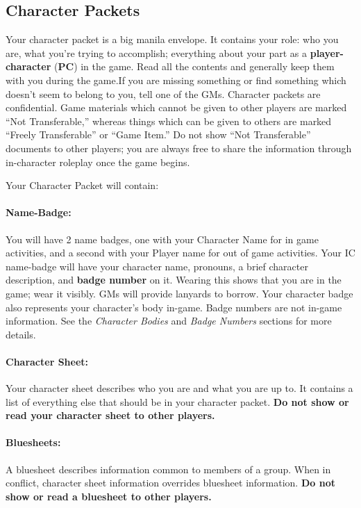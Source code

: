 \documentclass[sheet]{GL2020}
\begin{document}
\subsection{Character Packets}

Your character packet is a big manila envelope. It contains your role: who you are, what you're trying to accomplish; everything about your part as a {\bf player-character} ({\bf PC}) in the game. Read all the contents and generally keep them with you during the game.If you are missing something or find something which doesn't seem to belong to you, tell one of the GMs. Character packets are confidential. Game materials which cannot be given to other players are marked ``Not Transferable,'' whereas things which can be given to others are marked ``Freely Transferable'' or ``Game Item.'' Do not show ``Not Transferable'' documents to other players; you are always free to share the information through in-character roleplay once the game begins.

Your Character Packet will contain:
\paragraph{Name-Badge:} You will have 2 name badges, one with your Character Name for in game activities, and a second with your Player name for out of game activities. Your IC name-badge will have your character name, pronouns, a brief character description, and {\bf badge number} on it. Wearing this shows that you are in the game; wear it visibly. GMs will provide lanyards to borrow. Your character badge also represents your character's body in-game. Badge numbers are not in-game information. See the \emph{Character Bodies} and \emph{Badge Numbers} sections for more details.

\paragraph{Character Sheet:} Your character sheet describes who you are and what you are up to. It contains a list of everything else that should be in your character packet. \textbf{Do not show or read your character sheet to other players.}

\paragraph{Bluesheets:} A bluesheet describes information common to members of a group. When in conflict, character sheet information overrides bluesheet information. \textbf{Do not show or read a bluesheet to other players.}
\end{document}
